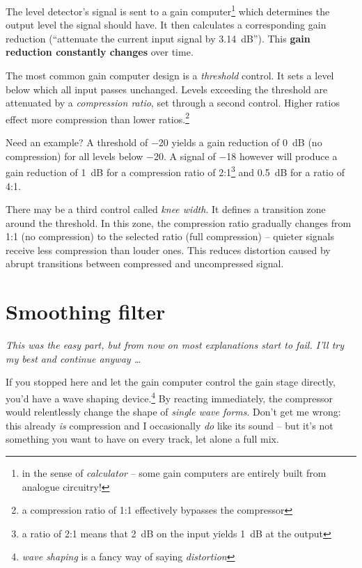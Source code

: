 The level detector's signal is sent to a gain computer\footnote{in the
  sense of \emph{calculator} -- some gain computers are entirely built
  from analogue circuitry!} which determines the output level the
signal should have.  It then calculates a corresponding gain reduction
(``attenuate the current input signal by \SI{3.14}{\dB}'').  This
\textbf{gain reduction constantly changes} over time.

The most common gain computer design is a \emph{threshold} control.
It sets a level below which all input passes unchanged.  Levels
exceeding the threshold are attenuated by a \emph{compression ratio},
set through a second control.  Higher ratios effect more compression
than lower ratios.\footnote{a compression ratio of 1:1 effectively
  bypasses the compressor}

Need an example?  A threshold of \SI{-20}{\dBFS} yields a gain
reduction of \SI{0}{\dB} (no compression) for all levels below
\SI{-20}{\dBFS}.  A signal of \SI{-18}{\dBFS} however will produce a
gain reduction of \SI{1}{\dB} for a compression ratio of
2:1\footnote{a ratio of 2:1 means that \SI{2}{\dB} on the input yields
  \SI{1}{\dB} at the output} and \SI{0.5}{\dB} for a ratio of 4:1.

There may be a third control called \emph{knee width}. It defines a
transition zone around the threshold.  In this zone, the compression
ratio gradually changes from 1:1 (no compression) to the selected
ratio (full compression) -- quieter signals receive less compression
than louder ones.  This reduces distortion caused by abrupt
transitions between compressed and uncompressed signal.

\section{Smoothing filter}
\label{sec:smoothing_filter}

\emph{This was the easy part, but from now on most explanations start
  to fail.  I'll try my best and continue anyway \dots}

If you stopped here and let the gain computer control the gain stage
directly, you'd have a wave shaping device.\footnote{\emph{wave
    shaping} is a fancy way of saying \emph{distortion}} By reacting
immediately, the compressor would relentlessly change the shape of
\emph{single wave forms}.  Don't get me wrong: this already \emph{is}
compression and I occasionally \emph{do} like its sound -- but it's
not something you want to have on every track, let alone a full mix.

